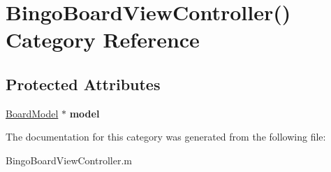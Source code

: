 \hypertarget{category_bingo_board_view_controller_07_08}{\section{Bingo\+Board\+View\+Controller() Category Reference}
\label{category_bingo_board_view_controller_07_08}
}
\subsection*{Protected Attributes}
\begin{DoxyCompactItemize}
\item 
\hypertarget{category_bingo_board_view_controller_07_08_ad4bcc5fe655f47b74e9014a00481819e}{\hyperlink{interface_board_model}{Board\+Model} $\ast$ {\bfseries model}}\label{category_bingo_board_view_controller_07_08_ad4bcc5fe655f47b74e9014a00481819e}

\end{DoxyCompactItemize}


The documentation for this category was generated from the following file\+:\begin{DoxyCompactItemize}
\item 
Bingo\+Board\+View\+Controller.\+m\end{DoxyCompactItemize}
